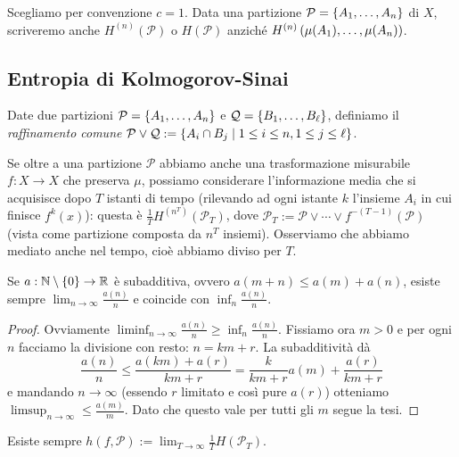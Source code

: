 Scegliamo per convenzione $c=1$.
Data una partizione $\mathcal{P}=\left\{A_1,\dots,A_n\right\}$ di $X$, scriveremo anche $H^{(n)}(\mathcal{P})$ o $H(\mathcal{P})$
anziché $H^{(n)}\left(\mu(A_1),\dots,\mu(A_n)\right)$.

\subsection{Entropia di Kolmogorov-Sinai}

\begin{defi}Date due partizioni $\mathcal{P}=\left\{A_1,\dots,A_n\right\}$ e $\mathcal{Q}=\left\{B_1,\dots,B_\ell\right\}$,
definiamo il \emph{raffinamento comune} $\mathcal{P}\vee\mathcal{Q}:=\left\{A_i\cap B_j\mid 1\le i\le n,1\le j\le \ell\right\}$.
\end{defi}

Se oltre a una partizione $\mathcal{P}$ abbiamo anche una trasformazione misurabile $f:X\to X$ che preserva $\mu$,
possiamo considerare l'informazione media che si acquisisce dopo $T$ istanti di tempo (rilevando
ad ogni istante $k$ l'insieme $A_i$ in cui finisce $f^k(x)$): questa è $\frac{1}{T}H^{(n^T)}(\mathcal{P}_T)$,
dove $\mathcal{P}_T:=\mathcal{P}\vee\cdots\vee f^{-(T-1)}(\mathcal{P})$ (vista come partizione composta
da $n^T$ insiemi). Osserviamo che abbiamo mediato anche nel tempo, cioè abbiamo diviso per $T$.

\begin{lemma}[Fekete]\label{fekete} Se $a:\mathbb{N}\setminus\left\{0\right\}\to\mathbb{R}$ è subadditiva, ovvero $a(m+n)\le a(m)+a(n)$, esiste sempre
$\lim_{n\to\infty}\frac{a(n)}{n}$ e coincide con $\inf_n\frac{a(n)}{n}$.
\end{lemma}

\begin{proof}Ovviamente $\liminf_{n\to\infty}\frac{a(n)}{n}\ge\inf_n\frac{a(n)}{n}$. Fissiamo ora $m>0$
e per ogni $n$ facciamo la divisione con resto: $n=km+r$. La subadditività dà
\[ \frac{a(n)}{n}\le\frac{a(km)+a(r)}{km+r}=\frac{k}{km+r}a(m)+\frac{a(r)}{km+r} \]
e mandando $n\to\infty$ (essendo $r$ limitato e così pure $a(r)$) otteniamo $\limsup_{n\to\infty}\le\frac{a(m)}{m}$.
Dato che questo vale per tutti gli $m$ segue la tesi.
\end{proof}

\begin{cor}Esiste sempre $h(f,\mathcal{P}):=\lim_{T\to\infty}\frac{1}{T}H(\mathcal{P}_T)$.
\end{cor}

